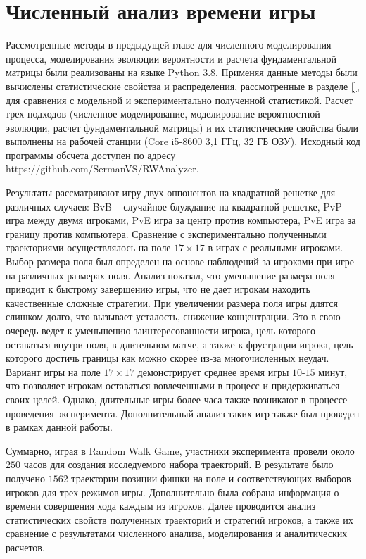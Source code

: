 \chapter{Численный анализ времени игры}\label{ch:ch3}

Рассмотренные методы в предыдущей главе для численного моделирования процесса,
моделирования эволюции вероятности и расчета фундаментальной матрицы 
были реализованы на языке Python 3.8. 
Применяя данные методы были вычислены статистические свойства и распределения, 
рассмотренные в разделе \cref{}, для сравнения с модельной и экспериментально полученной статистикой. 
Расчет трех подходов (численное моделирование, моделирование вероятностной эволюции, расчет фундаментальной матрицы) 
и их статистические свойства были выполнены на рабочей станции (Core i5-8600 3,1 ГГц, 32 ГБ ОЗУ). 
Исходный код программы обсчета доступен по адресу https://github.com/SermanVS/RWAnalyzer.

Результаты рассматривают игру двух оппонентов на квадратной решетке для различных случаев:
BvB -- случайное блуждание на квадратной решетке, PvP -- игра между двумя игроками, PvE игра за центр против компьютера, PvE игра за границу против компьютера. 
Сравнение с экспериментально полученными траекториями осуществлялось на поле $17 \times 17$ в играх с 
реальными игроками. Выбор размера поля был определен на основе наблюдений за игроками при игре на различных размерах поля.
Анализ показал, что уменьшение размера поля приводит к быстрому завершению игры, что не дает игрокам находить качественные сложные
стратегии. При увеличении размера поля игры длятся слишком долго, что вызывает усталость, снижение концентрации.
Это в свою очередь ведет к уменьшению заинтересованности игрока, цель которого оставаться внутри поля, в длительном матче,
а также к фрустрации игрока, цель которого достичь границы как можно скорее из-за многочисленных неудач.
Вариант игры на поле $17 \times 17$ демонстрирует среднее время игры $10$-$15$ минут, что позволяет игрокам оставаться вовлеченными
в процесс и придерживаться своих целей. Однако, длительные игры более часа также возникают в процессе проведения эксперимента.
Дополнительный анализ таких игр также был проведен в рамках данной работы.

Суммарно, играя в Random Walk Game, участники эксперимента провели около $250$ часов для создания исследуемого набора траекторий.
В результате было получено $1562$ траектории позиции фишки на поле и соответствующих выборов игроков для трех режимов игры. 
Дополнительно была собрана информация о времени совершения хода каждым из игроков. 
Далее проводится анализ статистических свойств полученных траекторий и стратегий игроков, 
а также их сравнение с результатами численного анализа, моделирования и аналитических расчетов.

